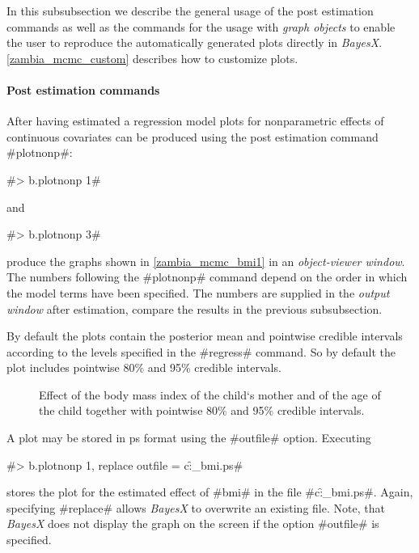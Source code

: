 In this subsubsection we describe the general usage of the post
estimation commands as well as the commands for the usage with
{\em graph objects} to enable the user to reproduce the
automatically generated plots directly in {\em BayesX}.
\autoref{zambia_mcmc_custom} describes how to customize plots.

\paragraph{Post estimation commands}

After having estimated a regression model plots for nonparametric
effects of continuous covariates can be produced using the post
estimation command #plotnonp#:

#> b.plotnonp 1#

and

#> b.plotnonp 3#

produce the graphs shown in \autoref{zambia_mcmc_bmi1} in an {\it
object-viewer window}. The numbers following the #plotnonp#
command depend on the order in which the model terms have been
specified. The numbers are supplied in the {\em output window}
after estimation, compare the results in the previous
subsubsection.

By default the plots contain the posterior mean and pointwise
credible intervals according to the levels specified in the
#regress# command. So by default the plot includes pointwise 80\%
and 95\% credible intervals.

\begin{figure}[ht]
\begin{center}
{\it\caption{Effect of the body mass index of the child`s mother
and of the age of the child together with pointwise 80\% and 95\%
credible intervals. \label{zambia_mcmc_bmi1}}}
\end{center}
\end{figure}

A plot may be stored in ps format using the #outfile# option.
Executing

#> b.plotnonp 1, replace outfile = c:\data\f_bmi.ps#

stores the plot for the estimated effect of #bmi# in the file
#c:\data\f_bmi.ps#. Again, specifying #replace# allows {\it
BayesX} to overwrite an existing file. Note, that {\it BayesX}
does not display the graph on the screen if the option #outfile#
is specified.

